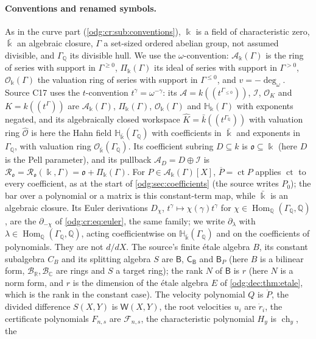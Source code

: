 \documentclass[11pt,oneside]{article}
\numberwithin{equation}{section}
\theoremstyle{definition}
\theoremstyle{remark}
\newcommand{\Q}{\mathbb Q}
\newcommand{\R}{\mathbb R}
\newcommand{\C}{\mathbb C}
\newcommand{\BR}{\mathcal B_{\R}}
\newcommand{\BC}{\mathcal B_{\C}}
\newcommand{\ct}{\operatorname{ct}}
\newcommand{\ddeg}{\operatorname{deg}_{\omega}}
\newcommand{\crH}{\mathbb H_\Bbbk(\Gamma)}
\newcommand{\crA}{\mathcal A_\Bbbk(\Gamma)}
\newcommand{\crP}{\Pi_\Bbbk(\Gamma)}
\newcommand{\crO}{\mathcal O_\Bbbk(\Gamma)}
\newcommand{\Hom}{\operatorname{Hom}}
\newcommand{\Hbar}{\mathbb H_{\bar\Bbbk}(\Gamma_\Q)}
\newcommand{\Obar}{\mathcal O_{\bar\Bbbk}(\Gamma_\Q)}
\begin{document}
\paragraph{Conventions and renamed symbols.} As in the curve part
(\cref{odg:cr:sub:conventions}), $\Bbbk$ is a field of characteristic zero, $\bar\Bbbk$
an algebraic closure, $\Gamma$ a set-sized ordered abelian group, not assumed divisible,
and $\Gamma_\Q$ its divisible hull. We use the $\omega$-convention: $\crA$ is the ring of
series with support in $\Gamma^{\ge0}$, $\crP$ its ideal of series with support in
$\Gamma^{>0}$, $\crO$ the valuation ring of series with support in $\Gamma^{\le0}$, and
$v=-\ddeg$. Source C17 uses the $t$-convention $t^\gamma=\omega^{-\gamma}$: its
$\mathcal A=k((t^{\Gamma_{\le0}}))$, $\mathcal I$, $\mathcal O_K$ and $K=k((t^\Gamma))$ are
$\crA$, $\crP$, $\crO$ and $\crH$ with exponents negated, and its algebraically closed
workspace $\widehat K=\bar k((t^{\Gamma_\Q}))$ with valuation ring $\widehat{\mathcal O}$
is here the Hahn field $\Hbar$ with coefficients in $\bar\Bbbk$ and exponents in
$\Gamma_\Q$, with valuation ring $\Obar$. Its coefficient subring $D\subseteq k$ is $\mathfrak o\subseteq\Bbbk$ (here $D$ is the
Pell parameter), and its pullback $\mathcal A_D=D\oplus\mathcal I$ is
$\mathcal R_{\mathfrak o}=\mathcal R_{\mathfrak o}(\Bbbk,\Gamma)=\mathfrak o+\crP$. For
$P\in\crA[X]$, $\overline P=\ct P$ applies $\ct$ to every coefficient, as at the start
of \cref{odg:sec:coefficients} (the source writes $P_0$); the bar over a polynomial or a
matrix is this constant-term map, while $\bar\Bbbk$ is an algebraic closure. Its Euler
derivations $D_\chi$, $t^\gamma\mapsto\chi(\gamma)t^\gamma$ for
$\chi\in\Hom_\Q(\Gamma_\Q,\Q)$, are the $\partial_{-\chi}$ of \eqref{odg:cr:eq:euler}, the
same family; we write $\partial_\lambda$ with $\lambda\in\Hom_\Q(\Gamma_\Q,\Q)$, acting
coefficientwise on $\Hbar$ and on the coefficients of polynomials. They are not $d/dX$.
The source's finite \'etale algebra $B$, its constant subalgebra $C_B$ and its splitting
algebra $S$ are $\mathsf B$, $\mathsf C_{\mathsf B}$ and $\mathsf B_P$ (here $B$ is a
bilinear form, $\BR,\BC$ are rings and $S$ a target ring); the rank $N$ of $\mathsf B$ is
$r$ (here $N$ is a norm form, and $r$ is the dimension of the \'etale algebra $E$ of
\cref{odg:dec:thm:etale}, which is the rank in the constant case). The velocity
polynomial $Q$ is $\dot P$, the divided difference $S(X,Y)$ is $\mathsf W(X,Y)$, the root
velocities $u_i$ are $\dot r_i$, the certificate polynomials $F_{n,s}$ are
$\mathcal F_{n,s}$, the characteristic polynomial $H_y$ is $\operatorname{ch}_y$, the
\end{document}
